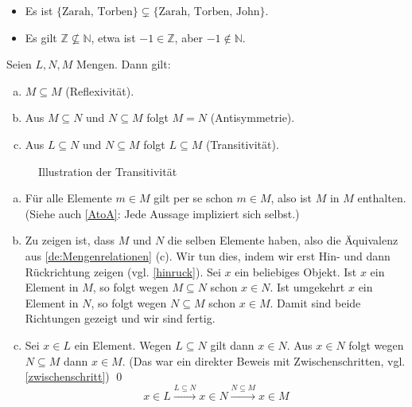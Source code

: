 \begin{bsp}\quad
	\begin{itemize}
		\item Es ist $\{\text{Zarah, Torben}\}\subsetneq\{\text{Zarah, Torben, John}\}$.
		\item Es gilt $\mathbb{Z}\nsubseteq\mathbb{N}$, etwa ist $-1\in\mathbb{Z}$, aber $-1\notin\mathbb{N}$.
	\end{itemize}
\end{bsp}

\begin{sat}\label{sat:Mengenrelationen}
Seien $L, N, M$ Mengen. Dann gilt:
	\begin{enumerate}[a)]
		\item $M\subseteq M$ (Reflexivität).
		\item Aus $M \subseteq N$ und $N\subseteq M$ folgt $M=N$ (Antisymmetrie).
		\item Aus $L\subseteq N$ und $N\subseteq M$ folgt $L\subseteq M$ (Transitivität).
	\end{enumerate}
\end{sat}

\begin{figure}[h]
	\centering \caption{Illustration der Transitivität}
\end{figure}

\begin{bew}
	\begin{enumerate}[a)]
		\item Für alle Elemente $m\in M$ gilt per se schon $m\in M$, also ist $M$ in $M$ enthalten. (Siehe auch \cref{AtoA}: Jede Aussage impliziert sich selbst.)
		\item Zu zeigen ist, dass $M$ und $N$ die selben Elemente haben, also die Äquivalenz aus \cref{de:Mengenrelationen} (c). Wir tun dies, indem wir erst Hin- und dann Rückrichtung zeigen (vgl. \cref{hinruck}). Sei $x$ ein beliebiges Objekt. Ist $x$ ein Element in $M$, so folgt wegen $M\subseteq N$ schon $x\in N$. Ist umgekehrt $x$ ein Element in $N$, so folgt wegen $N\subseteq M$ schon $x\in M$. Damit sind beide Richtungen gezeigt und wir sind fertig.
		\item Sei $x\in L$ ein Element. Wegen $L\subseteq N$ gilt dann $x\in N$. Aus $x\in N$ folgt wegen $N\subseteq M$ dann $x\in M$. (Das war ein direkter Beweis mit Zwischenschritten, vgl. \cref{zwischenschritt}) \qed
        \[ x\in L\xrightarrow{L\subseteq N} x\in N \xrightarrow{N\subseteq M} x\in M \]
	\end{enumerate}
\end{bew}

